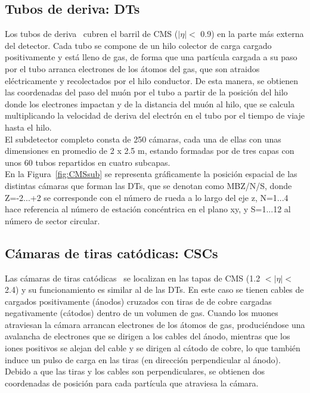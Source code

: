 \subsection{Tubos de deriva: DTs}\label{sec:DTs}

Los tubos de deriva~\cite{DTperformance} cubren el barril de CMS ($\lvert \eta \rvert <$ 0.9) en la parte m\'as externa del detector. Cada tubo se compone de un hilo colector de carga cargado positivamente y est\'a lleno de gas, de forma que una part\'icula cargada a su paso por el tubo arranca electrones de los \'atomos del gas, que son atraidos el\'ectricamente y recolectados por el hilo conductor. De esta manera, se obtienen las coordenadas del paso del mu\'on por el tubo a partir de la posici\'on del hilo donde los electrones impactan y de la distancia del mu\'on al hilo, que se calcula multiplicando la velocidad de deriva del electr\'on en el tubo por el tiempo de viaje hasta el hilo. \\

El subdetector completo consta de 250 c\'amaras, cada una de ellas con unas dimensiones en promedio de 2 x 2.5 m, estando formadas por de tres capas con unos 60 tubos repartidos en cuatro subcapas. \\
En la Figura~\ref{fig:CMSsub} se representa gr\'aficamente la posici\'on espacial de las distintas c\'amaras que forman las DTs, que se denotan como MBZ/N/S, donde Z=-2...+2 se corresponde con el n\'umero de rueda a lo largo del eje z, N=1...4 hace referencia al n\'umero de estaci\'on conc\'entrica en el plano xy, y S=1...12 al n\'umero de sector circular. 


\subsection{C\'amaras de tiras cat\'odicas: CSCs}\label{sec:CSCs}

Las c\'amaras de tiras cat\'odicas~\cite{CSCperformance} se localizan en las tapas de CMS (1.2 $< \lvert \eta \rvert <$ 2.4) y su funcionamiento es similar al de las DTs. En este caso se tienen cables de cargados positivamente (\'anodos) cruzados con tiras de de cobre cargadas negativamente (c\'atodos) dentro de un volumen de gas. Cuando los muones atraviesan la c\'amara arrancan electrones de los \'atomos de gas, produci\'endose una avalancha de electrones que se dirigen a los cables del \'anodo, mientras que los iones positivos se alejan del cable y se dirigen al c\'atodo de cobre, lo que tambi\'en induce un pulso de carga en las tiras (en direcci\'on perpendicular al \'anodo). Debido a que las tiras y los cables son perpendiculares, se obtienen dos coordenadas de posici\'on para cada part\'icula que atraviesa la c\'amara. \\

